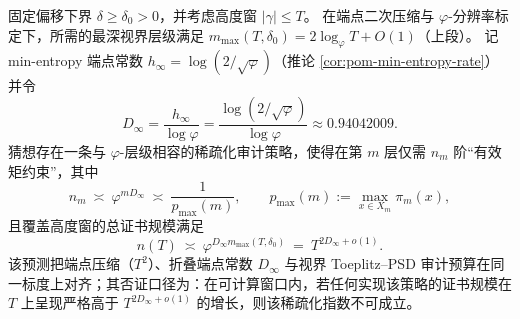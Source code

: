 \begin{conjecture}\label{conj:discussion-phi-sparsified-toeplitz-audit}
固定偏移下界 \(\delta\ge\delta_0>0\)，并考虑高度窗 \(|\gamma|\le T\)。
在端点二次压缩与 \(\varphi\)-分辨率标定下，所需的最深视界层级满足 \(m_{\max}(T,\delta_0)=2\log_{\varphi}T+O(1)\)（上段）。
记 min-entropy 端点常数 \(h_\infty=\log(2/\sqrt\varphi)\)（推论 \ref{cor:pom-min-entropy-rate}）并令
\[
D_\infty=\frac{h_\infty}{\log\varphi}=\frac{\log(2/\sqrt\varphi)}{\log\varphi}\approx 0.94042009.
\]
猜想存在一条与 \(\varphi\)-层级相容的稀疏化审计策略，使得在第 \(m\) 层仅需 \(n_m\) 阶“有效矩约束”，其中
\[
n_m\ \asymp\ \varphi^{mD_\infty}\ \asymp\ \frac{1}{p_{\max}(m)},
\qquad
p_{\max}(m):=\max_{x\in X_m}\pi_m(x),
\]
且覆盖高度窗的总证书规模满足
\[
n(T)\ \asymp\ \varphi^{D_\infty m_{\max}(T,\delta_0)}\ =\ T^{2D_\infty+o(1)}.
\]
该预测把端点压缩（\(T^2\)）、折叠端点常数 \(D_\infty\) 与视界 Toeplitz--PSD 审计预算在同一标度上对齐；其否证口径为：在可计算窗口内，若任何实现该策略的证书规模在 \(T\) 上呈现严格高于 \(T^{2D_\infty+o(1)}\) 的增长，则该稀疏化指数不可成立。
\end{conjecture}

